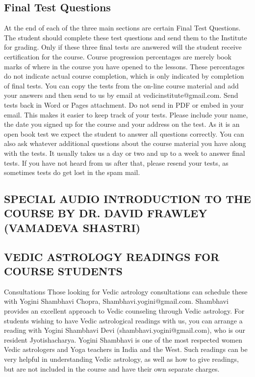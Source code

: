 \subsection{Final Test Questions}
At the end of each of the three main sections are certain Final Test Questions. The student should complete these test questions and send them to the Institute for grading.
Only if these three final tests are answered will the student receive certification for the course.
Course progression percentages are merely book marks of where in the course you have opened to the lessons. These percentages do not indicate actual course completion, which is only indicated by completion of final tests.
You can copy the tests from the on-line course material and add your answers and then send to us by email at vedicinstitute@gmail.com.
Send tests back in Word or Pages attachment. Do not send in PDF or embed in your email. This makes it easier to keep track of your tests.
Please include your name, the date you signed up for the course and your address on the test.
As it is an open book test we expect the student to answer all questions correctly.
You can also ask whatever additional questions about the course material you have along with the tests.
It usually takes us a day or two and up to a week to answer final tests. If you have not heard from us after that, please resend your tests, as sometimes tests do get lost in the spam mail.
 

\subsection{\textbf{SPECIAL AUDIO INTRODUCTION TO THE COURSE BY DR. DAVID FRAWLEY (VAMADEVA SHASTRI)}}
    

\subsection{VEDIC ASTROLOGY READINGS FOR COURSE STUDENTS}
Consultations
Those looking for Vedic astrology consultations can schedule these with Yogini Shambhavi Chopra, Shambhavi.yogini@gmail.com. Shambhavi provides an excellent approach to Vedic counseling through Vedic astrology. For students wishing to have Vedic astrological readings with us, you can arrange a reading with Yogini Shambhavi Devi (shambhavi.yogini@gmail.com), who is our resident Jyotishacharya. Yogini Shambhavi is one of the most respected women Vedic astrologers and Yoga teachers in India and the West.        Such readings can be very helpful in understanding Vedic astrology, as well as how to give readings, but are not included in the course and have their own separate charges.  


